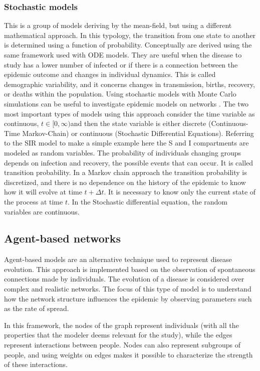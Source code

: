 \subsubsection{Stochastic models} 	
This is a group of models deriving by the mean-field, but using a different mathematical approach.
In this typology, the transition from one state to another is determined using a function of probability.  Conceptually are derived using the same framework used with ODE models. They are useful when the disease to study has a lower number of infected or if there is a connection between the epidemic outcome and changes in individual dynamics. This is called demographic variability, and it concerns changes in transmission, births, recovery, or deaths within the population. Using stochastic models with Monte Carlo simulations can be useful to investigate epidemic models on networks \cite{Allen2017}. 
The two most important types of models using this approach consider the time variable as continuous, $t \in [0, \infty) $and then the state variable is either discrete (Continuous-Time Markov-Chain) or continuous (Stochastic Differential Equations).
Referring to the SIR model to make a simple example here the S and I compartments are modeled as random variables. The probability of individuals changing groups depends on infection and recovery, the possible events that can occur. It is called transition probability. 
In a Markov chain approach the transition probability is discretized, and there is no dependence on the history of the epidemic to know how it will evolve at time $t + \Delta t$. It is necessary to know only the current state of the process at time $t$. 
In the Stochastic differential equation, the random variables are continuous. 

\subsection{Agent-based networks}

Agent-based models are an alternative technique used to represent disease evolution. This approach is implemented based on the observation of spontaneous connections made by individuals. The evolution of a disease is considered over complex and realistic networks. The focus of this type of model is to understand how the network structure influences the epidemic by observing parameters such as the rate of spread.

In this framework, the nodes of the graph represent individuals (with all the properties that the modeler deems relevant for the study), while the edges represent interactions between people. Nodes can also represent subgroups of people, and using weights on edges makes it possible to characterize the strength of these interactions.

